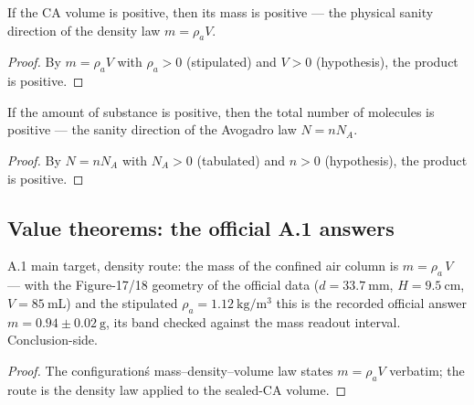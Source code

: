 \begin{theorem}
\label{thm:IPhO2026Problems_problem_IPhO_2026_4_A_1:mass_pos_of_volume_pos}
If the CA volume is positive, then its mass is positive --- the
physical sanity direction of the density law $m = \rho_a V$.
\end{theorem}
\begin{proof}
By $m = \rho_a V$ with $\rho_a > 0$ (stipulated) and $V > 0$
(hypothesis), the product is positive.
\end{proof}

\begin{theorem}
\label{thm:IPhO2026Problems_problem_IPhO_2026_4_A_1:numberOfMolecules_pos}
If the amount of substance is positive, then the total number of
molecules is positive --- the sanity direction of the Avogadro law
$N = n N_A$.
\end{theorem}
\begin{proof}
By $N = n N_A$ with $N_A > 0$ (tabulated) and $n > 0$ (hypothesis),
the product is positive.
\end{proof}

\subsection*{Value theorems: the official A.1 answers}

\begin{theorem}
\label{thm:IPhO2026Problems_problem_IPhO_2026_4_A_1:mass_of_confined_air}
A.1 main target, density route: the mass of the confined air column
is $m = \rho_a\, V$ --- with the Figure-17/18 geometry of the
official data ($d = 33.7\ \mathrm{mm}$, $H = 9.5\ \mathrm{cm}$,
$V = 85\ \mathrm{mL}$) and the stipulated
$\rho_a = 1.12\ \mathrm{kg/m^3}$ this is the recorded official answer
$m = 0.94 \pm 0.02\ \mathrm{g}$, its band checked against the mass
readout interval.  Conclusion-side.
\end{theorem}
\begin{proof}
The configuration\'s mass--density--volume law states
$m = \rho_a V$ verbatim; the route is the density law applied to the
sealed-CA volume.
\end{proof}

